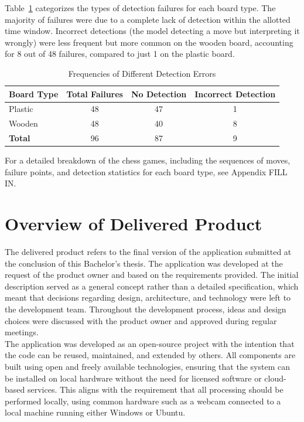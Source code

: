 Table~\ref{tab:different-errors} categorizes the types of detection failures for each board type. The majority of failures were due to a complete lack of detection within the allotted time window. Incorrect detections (the model detecting a move but interpreting it wrongly) were less frequent but more common on the wooden board, accounting for 8 out of 48 failures, compared to just 1 on the plastic board.  \\

\begin{table}[htbp]
\centering
\caption{Frequencies of Different Detection Errors}
\label{tab:different-errors}
\begin{tabular}{lccc}
\toprule
\textbf{Board Type} & \textbf{Total Failures} & \textbf{No Detection} & \textbf{Incorrect Detection} \\
\midrule
Plastic & 48 & 47 & 1 \\
Wooden & 48 & 40 & 8 \\
\midrule
\textbf{Total} & 96 & 87 & 9 \\
\bottomrule
\end{tabular}
\end{table}

For a detailed breakdown of the chess games, including the sequences of moves, failure points, and detection statistics for each board type, see Appendix FILL IN.


\section{Overview of Delivered Product}
The delivered product refers to the final version of the application submitted at the conclusion of this Bachelor’s thesis. The application was developed at the request of the product owner and based on the requirements provided. The initial description served as a general concept rather than a detailed specification, which meant that decisions regarding design, architecture, and technology were left to the development team. Throughout the development process, ideas and design choices were discussed with the product owner and approved during regular meetings. \\

The application was developed as an open-source project with the intention that the code can be reused, maintained, and extended by others. All components are built using open and freely available technologies, ensuring that the system can be installed on local hardware without the need for licensed software or cloud-based services. This aligns with the requirement that all processing should be performed locally, using common hardware such as a webcam connected to a local machine running either Windows or Ubuntu. \\

